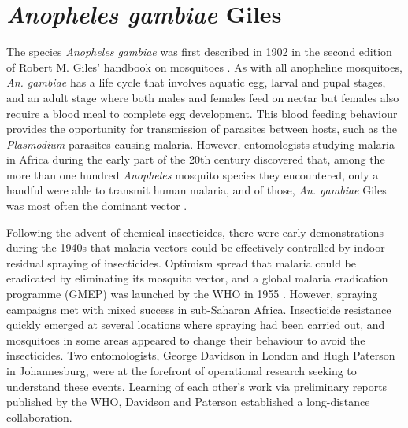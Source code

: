 \documentclass[a4paper,11pt,abstracton,hidelinks]{scrartcl}
\begin{document}
\tableofcontents


\section{\textit{Anopheles gambiae} Giles}

The species \textit{Anopheles gambiae} was first described in 1902 in the second edition of Robert M. Giles' handbook on mosquitoes \citep{Giles1902}.
%
As with all anopheline mosquitoes, \textit{An. gambiae} has a life cycle that involves aquatic egg, larval and pupal stages, and an adult stage where both males and females feed on nectar but females also require a blood meal to complete egg development.
%
This blood feeding behaviour provides the opportunity for transmission of parasites between hosts, such as the \textit{Plasmodium} parasites causing malaria.
%
However, entomologists studying malaria in Africa during the early part of the 20th century discovered that, among the more than one hundred \textit{Anopheles} mosquito species they encountered, only a handful were able to transmit human malaria, and of those, \textit{An. gambiae} Giles was most often the dominant vector \citep{DeMeillon1947,DeMeillon1950,Gillies1968}.

Following the advent of chemical insecticides, there were early demonstrations during the 1940s that malaria vectors could be effectively controlled by indoor residual spraying of insecticides.
%
Optimism spread that malaria could be eradicated by eliminating its mosquito vector, and a global malaria eradication programme (GMEP) was launched by the WHO in 1955 \citep{Najera2011}.
%
However, spraying campaigns met with mixed success in sub-Saharan Africa.
%
Insecticide resistance quickly emerged at several locations where spraying had been carried out, and mosquitoes in some areas appeared to change their behaviour to avoid the insecticides.
%
Two entomologists, George Davidson in London and Hugh Paterson in Johannesburg, were at the forefront of operational research seeking to understand these events.
%
Learning of each other's work via preliminary reports published by the WHO, Davidson and Paterson established a long-distance collaboration.


\end{document}
